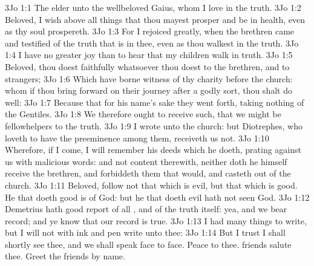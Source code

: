 \vs 3Jo 1:1 The elder unto the wellbeloved Gaius, whom I love in the truth.
\vs 3Jo 1:2 Beloved, I wish above all things that thou mayest prosper and be in health, even as thy soul prospereth.
\vs 3Jo 1:3 For I rejoiced greatly, when the brethren came and testified of the truth that is in thee, even as thou walkest in the truth.
\vs 3Jo 1:4 I have no greater joy than to hear that my children walk in truth.
\vs 3Jo 1:5 Beloved, thou doest faithfully whatsoever thou doest to the brethren, and to strangers;
\vs 3Jo 1:6 Which have borne witness of thy charity before the church: whom if thou bring forward on their journey after a godly sort, thou shalt do well:
\vs 3Jo 1:7 Because that for his name's sake they went forth, taking nothing of the Gentiles.
\vs 3Jo 1:8 We therefore ought to receive such, that we might be fellowhelpers to the truth.
\vs 3Jo 1:9 I wrote unto the church: but Diotrephes, who loveth to have the preeminence among them, receiveth us not.
\vs 3Jo 1:10 Wherefore, if I come, I will remember his deeds which he doeth, prating against us with malicious words: and not content therewith, neither doth he himself receive the brethren, and forbiddeth them that would, and casteth  out of the church.
\vs 3Jo 1:11 Beloved, follow not that which is evil, but that which is good. He that doeth good is of God: but he that doeth evil hath not seen God.
\vs 3Jo 1:12 Demetrius hath good report of all , and of the truth itself: yea, and we  bear record; and ye know that our record is true.
\vs 3Jo 1:13 I had many things to write, but I will not with ink and pen write unto thee:
\vs 3Jo 1:14 But I trust I shall shortly see thee, and we shall speak face to face. Peace  to thee.  friends salute thee. Greet the friends by name.
